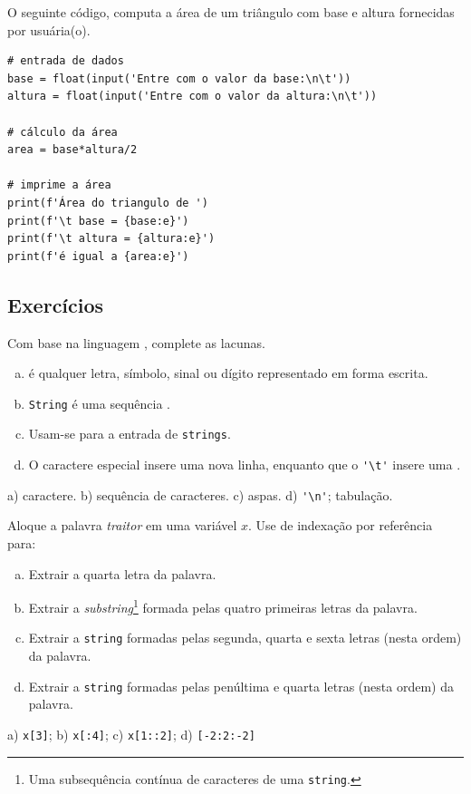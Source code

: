 \begin{ex}
  O seguinte código, computa a área de um triângulo com base e altura fornecidas por usuária(o).

\begin{lstlisting}
# entrada de dados
base = float(input('Entre com o valor da base:\n\t'))
altura = float(input('Entre com o valor da altura:\n\t'))

# cálculo da área
area = base*altura/2

# imprime a área
print(f'Área do triangulo de ')
print(f'\t base = {base:e}')
print(f'\t altura = {altura:e}')
print(f'é igual a {area:e}')
\end{lstlisting}

\end{ex}

\subsection{Exercícios}

\begin{exer}
  Com base na linguagem {\python}, complete as lacunas.
  \begin{enumerate}[a)]
    \item \underline{\phantom{Caractere}} é qualquer letra, símbolo, sinal ou dígito representado em forma escrita.
    \item \texttt{String} é uma sequência \underline{\phantom{caracteres}}.
    \item Usam-se \underline{\phantom{aspas}} para a entrada de \texttt{strings}.
    \item O caractere especial \underline{} insere uma nova linha, enquanto que o \lstinline{'\t'} insere uma \underline{\phantom{tabulação}}.
  \end{enumerate}
\end{exer}
\begin{resp}
  a) caractere. b) sequência de caracteres. c) aspas. d) \lstinline{'\n'}; tabulação.
\end{resp}

\begin{exer}
  Aloque a palavra \textit{traitor} em uma variável $x$. Use de indexação por referência para:
  \begin{enumerate}[a)]
  \item Extrair a quarta letra da palavra.
  \item Extrair a \textit{substring}\footnote{Uma subsequência contínua de caracteres de uma \texttt{string}.} formada pelas quatro primeiras letras da palavra.
  \item Extrair a \texttt{string} formadas pelas segunda, quarta e sexta letras (nesta ordem) da palavra.
  \item Extrair a \texttt{string} formadas pelas penúltima e quarta letras (nesta ordem) da palavra.
  \end{enumerate}
\end{exer}
\begin{resp}
  a) \lstinline+x[3]+; b) \lstinline+x[:4]+; c) \lstinline+x[1::2]+; d) \lstinline+[-2:2:-2]+
\end{resp}

